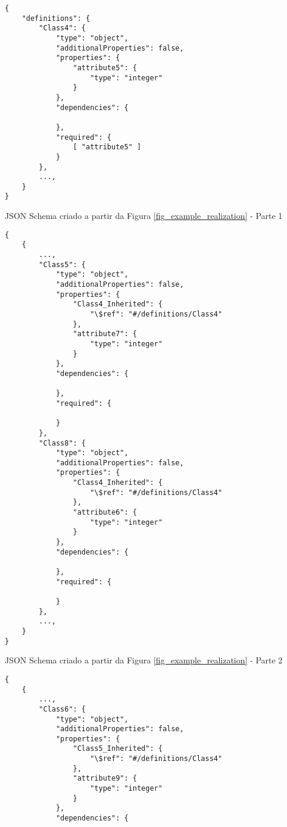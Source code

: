 \begin{anexosenv}
\begin{listing}
\begin{verbatim}
{
    "definitions": {
        "Class4": {
            "type": "object",
            "additionalProperties": false,
            "properties": {
                "attribute5": {
                    "type": "integer"
                }
            },
            "dependencies": {
            
            },
            "required": {
                [ "attribute5" ]
            }
        },
        ...,
    }
}
\end{verbatim}
\caption{JSON Schema criado a partir da Figura \ref{fig_example_realization} - Parte 1}
\end{listing}

\begin{listing}
\begin{verbatim}
{
    {
        ...,
        "Class5": {
            "type": "object",
            "additionalProperties": false,
            "properties": {
                "Class4_Inherited": {
                    "\$ref": "#/definitions/Class4"
                },
                "attribute7": {
                    "type": "integer"
                }
            },
            "dependencies": {
            
            },
            "required": {
                
            }
        }, 
        "Class8": {
            "type": "object",
            "additionalProperties": false,
            "properties": {
                "Class4_Inherited": {
                    "\$ref": "#/definitions/Class4"
                },
                "attribute6": {
                    "type": "integer"
                }
            },
            "dependencies": {
            
            },
            "required": {
                
            }
        },
        ...,
    }
}
\end{verbatim}
\caption{JSON Schema criado a partir da Figura \ref{fig_example_realization} - Parte 2}
\end{listing}

\begin{listing}
\begin{verbatim}
{
    {
        ...,
        "Class6": {
            "type": "object",
            "additionalProperties": false,
            "properties": {
                "Class5_Inherited": {
                    "\$ref": "#/definitions/Class4"
                },
                "attribute9": {
                    "type": "integer"
                }
            },
            "dependencies": {
            

\end{verbatim}
\end{listing}
\end{anexosenv}
